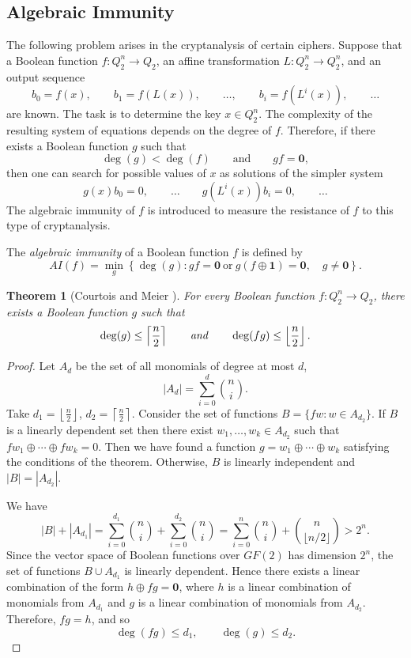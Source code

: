 \documentclass[11pt]{article}
\newtheorem{theorem}{Theorem}[section]
\theoremstyle{definition}
\begin{document}
{{{\subsection{Algebraic Immunity}

The following problem arises in the cryptanalysis of certain
ciphers. Suppose that a Boolean function
$f:Q_2^n\rightarrow Q_2$, an affine transformation
$L:Q_2^n\rightarrow Q_2^n$, and an output sequence
\[
b_0=f(x),\qquad b_1=f(L(x)),\qquad
\dots,\qquad b_i=f(L^i(x)),\qquad\dots
\]
are known. The task is to determine the key $x\in Q_2^n$.
The complexity of the resulting system of equations depends on the
degree of $f$. Therefore, if there exists a Boolean function $g$ such
that
\[
\deg(g)<\deg(f)
\qquad\text{and}\qquad
gf=\mathbf{0},
\]
then one can search for possible values of $x$ as solutions of the
simpler system
\[
g(x)b_0=0,\qquad\dots\qquad
g(L^i(x))b_i=0,\qquad\dots
\]
The algebraic immunity of $f$ is introduced to measure the resistance
of $f$ to this type of cryptanalysis.

The {\sl algebraic immunity} of a Boolean function $f$ is defined by
\[
AI(f)=
\min_g
\left\{
\deg(g):
gf=\mathbf{0}
\ \text{or}\
g(f\oplus\mathbf{1})=\mathbf{0},
\quad g\neq\mathbf{0}
\right\}.
\]

\begin{theorem}[Courtois and Meier \cite{CMeier}]\label{th:Court}
For every Boolean function $f:Q_2^n\rightarrow Q_2$, there exists a
Boolean function $g$ such that
\[
\deg(g)\leq\left\lceil\frac n2\right\rceil \qquad
{\it and}\qquad
\deg(fg)\leq\left\lfloor\frac n2\right\rfloor.
\]
\end{theorem}

\begin{proof}
Let $A_d$ be the set of all monomials of degree at most $d$,
\[
|A_d|=\sum_{i=0}^d{n\choose i}.
\]
Take
$d_1=\left\lfloor\frac n2\right\rfloor$,
$d_2=\left\lceil\frac n2\right\rceil$.
Consider the set of functions
$
B=\{fw:w\in A_{d_2}\}$.
If $B$ is a linearly dependent set then  there exist $w_1,\dots, w_k\in A_{d_2} $ such that $fw_1\oplus\cdots\oplus fw_k=0$. Then we have found  a function $g=w_1\oplus \cdots \oplus w_k$ satisfying the conditions of the theorem. Otherwise,  $B$ is linearly independent   and $|B|=|A_{d_2}|$.

We have
\[
|B|+|A_{d_1}|=
\sum_{i=0}^{d_1}{n\choose i}
+
\sum_{i=0}^{d_2}{n\choose i}
=
\sum_{i=0}^{n}{n\choose i}
+
{n\choose\lfloor n/2\rfloor}
>2^n.
\]
Since the vector space of Boolean functions over $GF(2)$ has
dimension $2^n$, the set of functions
$B\cup A_{d_1}$ is linearly dependent. Hence there exists a linear
combination of the form
$h\oplus fg=\mathbf{0}$,
where $h$ is a linear combination of monomials from $A_{d_1}$ and
$g$ is a linear combination of monomials from $A_{d_2}$.
Therefore,
$fg=h$,
and so
\[
\deg(fg)\leq d_1,
\qquad
\deg(g)\leq d_2.
\]
\end{proof}

}}}
\end{document}
